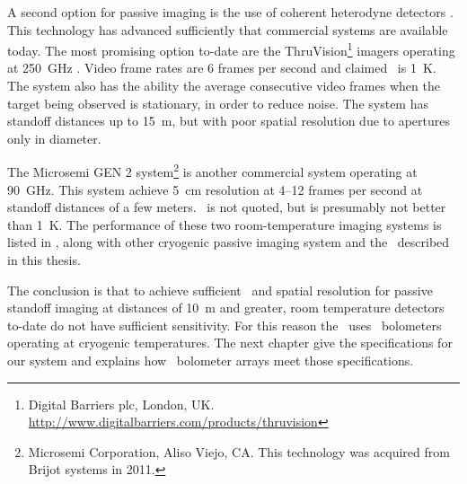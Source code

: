 A second option for passive imaging is the use of coherent heterodyne detectors \cite{rieke_detection_2003,rogalski_terahertz_2011}.
This technology has advanced sufficiently that commercial systems are available today.
The most promising option to-date are the ThruVision\footnote{Digital Barriers plc, London, UK. \url{http://www.digitalbarriers.com/products/thruvision}} imagers operating at \SI{250}{\GHz} \cite{mann_first_2009,digital_barriers_extra_????}.
Video frame rates are 6 frames per second and claimed \NETD\ is \SI{1}{\K}.
The system also has the ability the average consecutive video frames when the target being observed is stationary, in order to reduce noise.
The system has standoff distances up to \SI{15}{\m}, but with poor spatial resolution due to apertures only  in diameter.

The Microsemi GEN 2 system\footnote{%
Microsemi Corporation, Aliso Viejo, CA. This technology was acquired from Brijot systems in 2011.}
is another commercial system operating at \SI{90}{\GHz}.
This system achieve \SI{5}{\cm} resolution at 4--12 frames per second at standoff distances of a few meters.
\NETD\ is not quoted, but is presumably not better than \SI{1}{\K}.
The performance of these two room-temperature imaging systems is listed in , along with other cryogenic passive imaging system and the \Imager\ described in this thesis.

The conclusion is that to achieve sufficient \NETD\ and spatial resolution for passive standoff imaging at distances of \SI{10}{\m} and greater, room temperature detectors to-date do not have sufficient sensitivity.
For this reason the \Imager\ uses \TES\ bolometers operating at cryogenic temperatures.
The next chapter give the specifications for our system and explains how \TES\ bolometer arrays meet those specifications.
